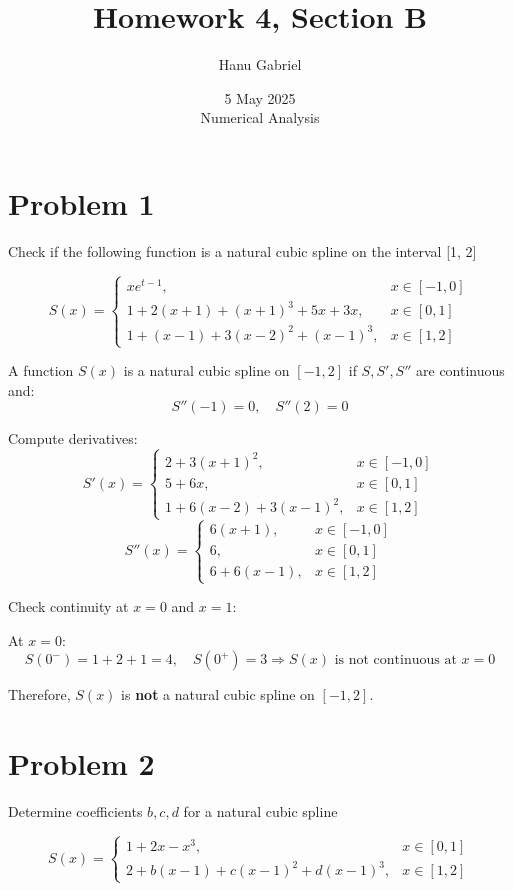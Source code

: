 \documentclass{article}
\title{Homework 4, Section B}
\author{Hanu Gabriel}
\date{5 May 2025 \\
Numerical Analysis}
\begin{document}
\maketitle

\section*{Problem 1}
Check if the following function is a natural cubic spline on the interval [1, 2]

\[
S(x) =
\begin{cases}
x e^{t-1}, & x \in [-1, 0] \\
1 + 2(x+1) + (x+1)^3 + 5x + 3x, & x \in [0,1] \\
1 + (x-1) + 3(x-2)^2 + (x-1)^3, & x \in [1,2]
\end{cases}
\]

A function \( S(x) \) is a natural cubic spline on \([-1,2]\) if \( S, S', S'' \) are continuous and:
\[
S''(-1) = 0, \quad S''(2) = 0
\]

Compute derivatives:
\[
S'(x) =
\begin{cases}
2 + 3(x+1)^2, & x \in [-1,0] \\
5 + 6x, & x \in [0,1] \\
1 + 6(x-2) + 3(x-1)^2, & x \in [1,2]
\end{cases}
\]
\[
S''(x) =
\begin{cases}
6(x+1), & x \in [-1,0] \\
6, & x \in [0,1] \\
6 + 6(x-1), & x \in [1,2]
\end{cases}
\]

Check continuity at \( x = 0 \) and \( x = 1 \):

At \( x = 0 \):
\[
S(0^-) = 1 + 2 + 1 = 4, \quad S(0^+) = 3 \Rightarrow S(x) \text{ is not continuous at } x = 0
\]

Therefore, \( S(x) \) is \textbf{not} a natural cubic spline on \([-1,2]\).

\section*{Problem 2}
Determine coefficients \( b, c, d \) for a natural cubic spline

\[
S(x) =
\begin{cases}
1 + 2x - x^3, & x \in [0,1] \\
2 + b(x-1) + c(x-1)^2 + d(x-1)^3, & x \in [1,2]
\end{cases}
\]
\end{document}
